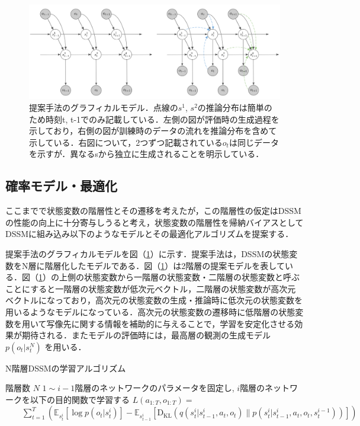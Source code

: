 \begin{figure}[tbp]
  \begin{center}
    \includegraphics[width=\linewidth]{./figures/proposal.png}
    \caption[提案手法のグラフィカルモデル]{提案手法のグラフィカルモデル．点線の$s^1$, $s^2$の推論分布は簡単のため時刻t, t-1でのみ記載している．左側の図が評価時の生成過程を示しており，右側の図が訓練時のデータの流れを推論分布を含めて示している．右図について，2つずつ記載されている$o_t$は同じデータを示すが．異なるsから独立に生成されることを明示している．}
    \label{fig:proposal}
  \end{center}
\end{figure}

\subsection{確率モデル・最適化}

ここまでで状態変数の階層性とその遷移を考えたが，この階層性の仮定はDSSMの性能の向上に十分寄与しうると考え，状態変数の階層性を帰納バイアスとしてDSSMに組み込み以下のようなモデルとその最適化アルゴリズムを提案する．

\vspace{\baselineskip}
提案手法のグラフィカルモデルを図（\ref{fig:proposal}）に示す．提案手法は，DSSMの状態変数をN層に階層化したモデルである．図（\ref{fig:proposal}）は2階層の提案モデルを表している．図（\ref{fig:proposal}）の上側の状態変数から一階層の状態変数・二階層の状態変数と呼ぶことにすると一階層の状態変数が低次元ベクトル，二階層の状態変数が高次元ベクトルになっており，高次元の状態変数の生成・推論時に低次元の状態変数を用いるようなモデルになっている．高次元の状態変数の遷移時に低階層の状態変数を用いて写像先に関する情報を補助的に与えることで，学習を安定化させる効果が期待される．またモデルの評価時には，最高層の観測の生成モデル $p(o_t|s^N_t)$ を用いる．

\begin{algorithm}[tbp]               
  \caption{N階層DSSMの学習アルゴリズム}
  \label{alg1}
  \begin{algorithmic}
    \REQUIRE 階層数 $N$ 
        \STATE $1 \sim i-1$階層のネットワークのパラメータを固定し, 
        \STATE $i$階層のネットワークを以下の目的関数で学習する
        \STATE $L(a_{1:T}, o_{1:T}) = $
        \STATE $ \hspace{2em}\sum_{t=1}^T ( \mathbb{E}_{s^i_t} [\log p(o_t|s^i_t)] - \mathbb{E}_{s^i_{t-1}} [\mathrm{D_{KL}}(q(s^i_t|s^i_{t-1}, a_t, o_t) \| p(s^i_t|s^i_{t-1}, a_t, o_t, s^{i-1}_t))]) $
      \ENDWHILE
    \ENDFOR
  \end{algorithmic}
\end{algorithm}

